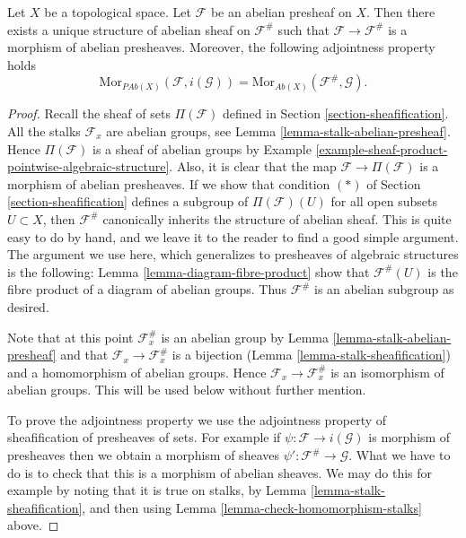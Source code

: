 \begin{lemma}
\label{lemma-sheafify-abelian-presheaf}
Let $X$ be a topological space.
Let $\mathcal{F}$ be an abelian presheaf on $X$.
Then there exists a unique structure of
abelian sheaf on $\mathcal{F}^\#$ such that
$\mathcal{F} \to \mathcal{F}^\#$ is a morphism
of abelian presheaves. Moreover, the following adjointness
property holds
$$
\text{Mor}_{\textit{PAb}(X)}(\mathcal{F}, i(\mathcal{G}))
=
\text{Mor}_{\textit{Ab}(X)}(\mathcal{F}^\#, \mathcal{G}).
$$
\end{lemma}

\begin{proof}
Recall the sheaf of sets $\Pi(\mathcal{F})$ defined in
Section \ref{section-sheafification}. All the stalks
$\mathcal{F}_x$ are abelian groups, see
Lemma \ref{lemma-stalk-abelian-presheaf}.
Hence $\Pi(\mathcal{F})$ is a sheaf of abelian groups by
Example \ref{example-sheaf-product-pointwise-algebraic-structure}.
Also, it is clear that the map $\mathcal{F} \to \Pi(\mathcal{F})$
is a morphism of abelian presheaves. If we show that
condition $(*)$ of Section \ref{section-sheafification} defines a subgroup
of $\Pi(\mathcal{F})(U)$ for all open subsets $U \subset X$,
then $\mathcal{F}^\#$ canonically inherits the structure of abelian sheaf.
This is quite easy to do by hand, and we leave it to the
reader to find a good simple argument. The argument we use here,
which generalizes to presheaves of algebraic structures is the following:
Lemma \ref{lemma-diagram-fibre-product} show that
$\mathcal{F}^\#(U)$ is the fibre product of a diagram
of abelian groups. Thus $\mathcal{F}^\#$ is an abelian
subgroup as desired.

\medskip\noindent
Note that at this point $\mathcal{F}^\#_x$ is an abelian
group by Lemma \ref{lemma-stalk-abelian-presheaf}
and that $\mathcal{F}_x \to \mathcal{F}^\#_x$ is a
bijection (Lemma \ref{lemma-stalk-sheafification})
and a homomorphism of abelian groups. Hence
$\mathcal{F}_x \to \mathcal{F}^\#_x$ is an isomorphism
of abelian groups. This will be used below without further mention.

\medskip\noindent
To prove the adjointness property we use the adjointness
property of sheafification of presheaves of sets. For example
if $\psi : \mathcal{F} \to i(\mathcal{G})$ is morphism of presheaves
then we obtain a morphism of sheaves
$\psi' : \mathcal{F}^\# \to \mathcal{G}$. What we have to do is to check
that this is a morphism of abelian sheaves. We may do this
for example by noting that it is true on stalks,
by Lemma \ref{lemma-stalk-sheafification}, and then using
Lemma \ref{lemma-check-homomorphism-stalks} above.
\end{proof}



